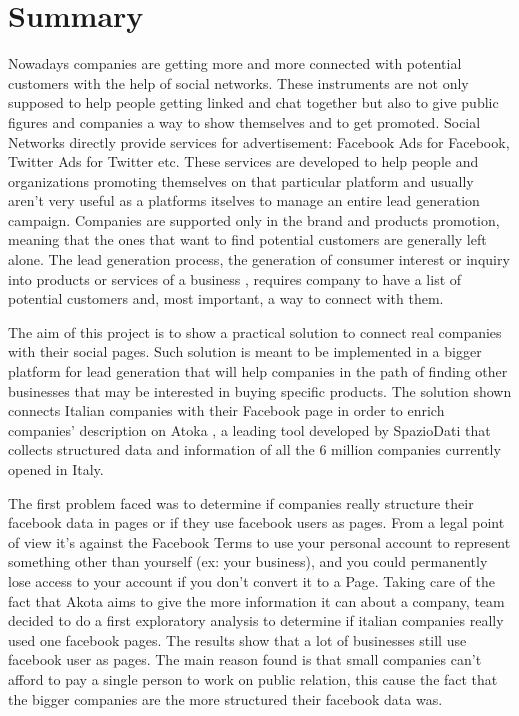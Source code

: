 \chapter*{Summary} %
\label{Summary}




Nowadays companies are getting more and more connected with potential customers with the help of social networks. These instruments are not only supposed to help people getting linked and chat together but also to give public figures and companies a way to show themselves and to get promoted. Social Networks directly provide services for advertisement: Facebook Ads for Facebook, Twitter Ads for Twitter etc. These services are developed to help people and organizations promoting themselves on that particular platform and usually aren't very useful as a platforms itselves to manage an entire lead generation campaign. Companies are supported only in the brand and products promotion, meaning that the ones that want to find potential customers are generally left alone. The lead generation process, the generation of consumer interest or inquiry into products or services of a business
, requires company to have a list of potential customers and, most important, a way to connect with them.



The aim of this project is to show a practical solution to connect real companies with their social pages.
Such solution is meant to be implemented in a bigger platform for lead generation that will help companies in the path of finding other businesses that may be interested in buying specific products. 
The solution shown connects Italian companies with their Facebook page in order to enrich companies' description on Atoka
, a leading tool developed by SpazioDati
 that collects structured data and information of all the 6 million companies currently opened in Italy.




The first problem faced was to determine if companies really structure their facebook data in pages or if they use facebook users as pages. 
From a legal point of view it's against the Facebook Terms to use your personal account to represent something other than yourself (ex: your business), and you could permanently lose access to your account if you don't convert it to a Page. Taking care of the fact that Akota aims to give the more information it can about a company, team decided to do a first exploratory analysis to determine if italian companies really used one facebook pages. The results show that a lot of businesses still use facebook user as pages. The main reason found is that small companies can't afford to pay a single person to work on public relation, this cause the fact that the bigger companies are the more structured their facebook data was.


